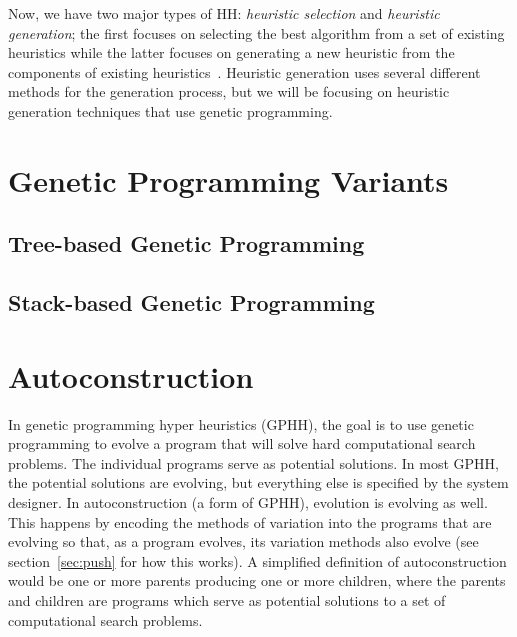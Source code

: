 \documentclass{sig-alternate}
\begin{document}
Now, we have two major types of HH: \textit{heuristic selection} and \textit{heuristic generation}; the first focuses on selecting the best algorithm from a set of existing heuristics while the latter focuses on generating a new heuristic from the components of existing heuristics~\cite{pappa:2014}. Heuristic generation uses several different methods for the generation process, but we will be focusing on heuristic generation techniques that use genetic programming.

\section{Genetic Programming Variants}
\label{sec:gpvariants}

\subsection{Tree-based Genetic Programming}
\label{sec:tgp}

\subsection{Stack-based Genetic Programming}
\label{sec:sgp}

\section{Autoconstruction}
\label{sec:ac}
In genetic programming hyper heuristics (GPHH), the goal is to use genetic programming to evolve a program that will solve hard computational search problems. The individual programs serve as potential solutions. In most GPHH, the potential solutions are evolving, but everything else is specified by the system designer.  In autoconstruction (a form of GPHH), evolution is evolving as well. This happens by encoding the methods of variation into the programs that are evolving so that, as a program evolves, its variation methods also evolve (see section~\ref{sec:push} for how this works). A simplified definition of autoconstruction would be one or more parents producing one or more children, where the parents and children are programs which serve as potential solutions to a set of computational search problems.
\end{document}
